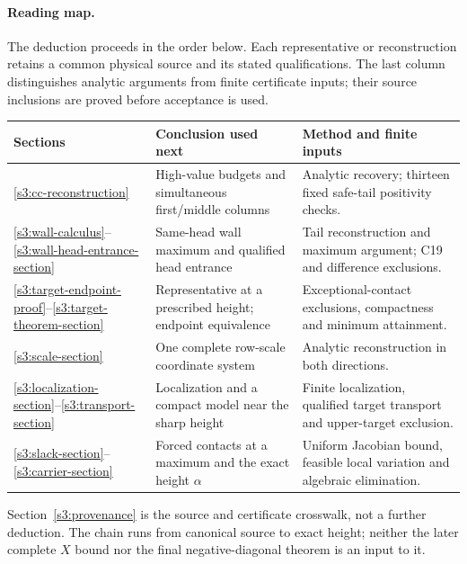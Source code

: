 \documentclass[11pt,reqno]{amsart}
\theoremstyle{definition}
\theoremstyle{remark}
\begin{document}
\paragraph{Reading map.}
The deduction proceeds in the order below. Each representative or
reconstruction retains a common physical source and its stated
qualifications. The last column distinguishes analytic arguments from
finite certificate inputs; their source inclusions are proved before
acceptance is used.
\begin{center}
\small
\begin{tabular}{@{}>{\raggedright\arraybackslash}p{.15\linewidth}
                  >{\raggedright\arraybackslash}p{.40\linewidth}
                  >{\raggedright\arraybackslash}p{.39\linewidth}@{}}
\toprule
Sections & Conclusion used next & Method and finite inputs\\
\midrule
\ref{s3:cc-reconstruction} &
High-value budgets and simultaneous first/middle columns &
Analytic recovery; thirteen fixed safe-tail positivity checks.\\[2pt]
\ref{s3:wall-calculus}--\ref{s3:wall-head-entrance-section} &
Same-head wall maximum and qualified head entrance &
Tail reconstruction and maximum argument; C19 and difference exclusions.\\[2pt]
\ref{s3:target-endpoint-proof}--\ref{s3:target-theorem-section} &
Representative at a prescribed height; endpoint equivalence &
Exceptional-contact exclusions, compactness and minimum attainment.\\[2pt]
\ref{s3:scale-section} &
One complete row-scale coordinate system &
Analytic reconstruction in both directions.\\[2pt]
\ref{s3:localization-section}--\ref{s3:transport-section} &
Localization and a compact model near the sharp height &
Finite localization, qualified target transport and upper-target exclusion.\\[2pt]
\ref{s3:slack-section}--\ref{s3:carrier-section} &
Forced contacts at a maximum and the exact height \(\alpha\) &
Uniform Jacobian bound, feasible local variation and algebraic elimination.\\
\bottomrule
\end{tabular}
\end{center}
Section~\ref{s3:provenance} is the source and certificate crosswalk,
not a further deduction. The chain runs from canonical source to exact
height; neither the later complete \(X\) bound nor the final
negative-diagonal theorem is an input to it.
\end{document}
